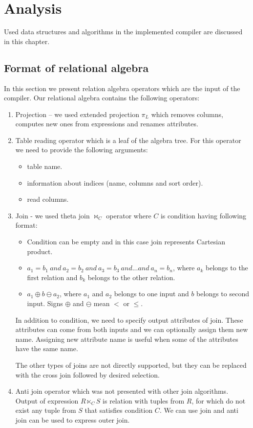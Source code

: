 \chapter{Analysis}
\label{analysis}
Used data structures and algorithms in the implemented compiler are discussed in this chapter.
\section{Format of relational algebra}

In this section we present relation algebra operators which are the input of the compiler. Our relational algebra contains the following operators:
\begin{enumerate}
\item Projection -- we used extended projection $\pi_L$ which removes columns, computes new ones from expressions and renames attributes.

\item Table reading operator which is a leaf of the algebra tree. For this operator we need to provide the following arguments:
\begin{itemize}
\item table name.
\item information about indices (name, columns and sort order).
\item read columns.
\end{itemize}
\item Join - we used theta join $\Join_C$ operator where $C$ is condition having following format:
\begin{itemize}
\item Condition can be empty and in this case join represents Cartesian product.
\item $a_1=b_1~and~a_2=b_2~and~a_3=b_3~and...and~a_n=b_n$, where $a_k$ belongs to the first relation and $b_k$ belongs to the other relation.
\item $a_1\oplus b \ominus a_2$, where $a_1$ and $a_2$ belongs to one input and $b$ belongs to second input. Signs $\oplus$ and $\ominus$ mean $<$ or $\leq$.

\end{itemize}

In addition to condition, we need to specify output attributes of join. These attributes can come from both inputs and we can optionally assign them new name. Assigning new attribute name is useful when some of the attributes have the same name.

The other types of joins are not directly supported, but they can be replaced with the cross join followed by desired selection.
\item Anti join operator which was not presented with other join algorithms. Output of expression $R \ltimes_C S$ is relation with tuples from $R$, for which do not exist any tuple from $S$ that satisfies condition $C$. We can use join and anti join can be used to express outer join.
 

\end{enumerate}

